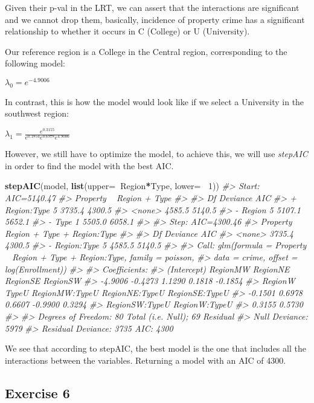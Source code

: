 \documentclass[]{article}
\newenvironment{Shaded}{\begin{snugshade}}{\end{snugshade}}
\newcommand{\CommentTok}[1]{\textcolor[rgb]{0.56,0.35,0.01}{\textit{#1}}}
\newcommand{\DataTypeTok}[1]{\textcolor[rgb]{0.13,0.29,0.53}{#1}}
\newcommand{\DecValTok}[1]{\textcolor[rgb]{0.00,0.00,0.81}{#1}}
\newcommand{\KeywordTok}[1]{\textcolor[rgb]{0.13,0.29,0.53}{\textbf{#1}}}
\newcommand{\NormalTok}[1]{#1}
\newcommand{\OperatorTok}[1]{\textcolor[rgb]{0.81,0.36,0.00}{\textbf{#1}}}
\begin{document}
Given their p-val in the LRT, we can assert that the interactions are
significant and we cannot drop them, basically, incidence of property
crime has a significant relationship to whether it occurs in C (College)
or U (University).

Our reference region is a College in the Central region, corresponding
to the following model:

\(\lambda_0 = e^{-4.9006}\)

In contrast, this is how the model would look like if we select a
University in the southwest region:

\(\lambda_1 = \frac{e^{0.3155}}{e^{0.1854} e^{0.6978} e^{4.9006}}\)

However, we still have to optimize the model, to achieve this, we will
use \emph{stepAIC} in order to find the model with the best AIC.

\begin{Shaded}
\begin{Highlighting}[]
\KeywordTok{stepAIC}\NormalTok{(model, }\KeywordTok{list}\NormalTok{(}\DataTypeTok{upper=}\OperatorTok{~}\NormalTok{Region}\OperatorTok{*}\NormalTok{Type, }\DataTypeTok{lower=} \OperatorTok{~}\DecValTok{1}\NormalTok{))}
\CommentTok{#> Start:  AIC=5140.47}
\CommentTok{#> Property ~ Region + Type}
\CommentTok{#> }
\CommentTok{#>               Df Deviance    AIC}
\CommentTok{#> + Region:Type  5   3735.4 4300.5}
\CommentTok{#> <none>             4585.5 5140.5}
\CommentTok{#> - Region       5   5107.1 5652.1}
\CommentTok{#> - Type         1   5505.0 6058.1}
\CommentTok{#> }
\CommentTok{#> Step:  AIC=4300.46}
\CommentTok{#> Property ~ Region + Type + Region:Type}
\CommentTok{#> }
\CommentTok{#>               Df Deviance    AIC}
\CommentTok{#> <none>             3735.4 4300.5}
\CommentTok{#> - Region:Type  5   4585.5 5140.5}
\CommentTok{#> }
\CommentTok{#> Call:  glm(formula = Property ~ Region + Type + Region:Type, family = poisson, }
\CommentTok{#>     data = crime, offset = log(Enrollment))}
\CommentTok{#> }
\CommentTok{#> Coefficients:}
\CommentTok{#>    (Intercept)        RegionMW        RegionNE        RegionSE        RegionSW  }
\CommentTok{#>        -4.9006         -0.4273          1.1290          0.1818         -0.1854  }
\CommentTok{#>        RegionW           TypeU  RegionMW:TypeU  RegionNE:TypeU  RegionSE:TypeU  }
\CommentTok{#>        -0.1501          0.6978          0.6607         -0.9900          0.3294  }
\CommentTok{#> RegionSW:TypeU   RegionW:TypeU  }
\CommentTok{#>         0.3155          0.5730  }
\CommentTok{#> }
\CommentTok{#> Degrees of Freedom: 80 Total (i.e. Null);  69 Residual}
\CommentTok{#> Null Deviance:       5979 }
\CommentTok{#> Residual Deviance: 3735  AIC: 4300}
\end{Highlighting}
\end{Shaded}

We see that according to stepAIC, the best model is the one that
includes all the interactions between the variables. Returning a model
with an AIC of 4300.

\hypertarget{exercise-6}{%
\subsection{Exercise 6}\label{exercise-6}}
\end{document}
